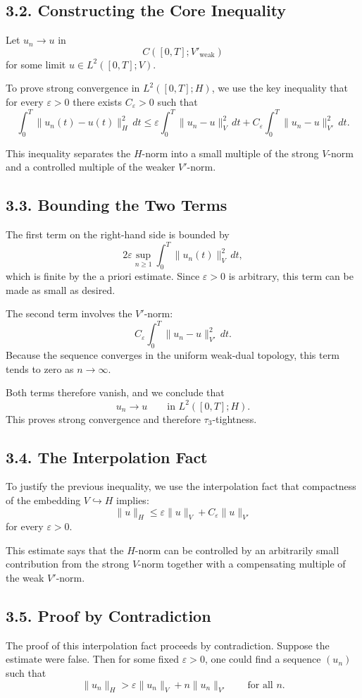 \documentclass[11pt]{article}
\theoremstyle{definition}
\theoremstyle{remark}
\begin{document}
\subsection*{3.2. Constructing the Core Inequality}
Let \(u_n\to u\) in
\[
C([0,T];V'_{\mathrm{weak}})
\]
for some limit \(u\in L^2([0,T];V)\).

To prove strong convergence in \(L^2([0,T];H)\), we use the key inequality that for every \(\varepsilon>0\) there exists \(C_\varepsilon>0\) such that
\[
\int_0^T \|u_n(t)-u(t)\|_H^2\,dt
\le
\varepsilon \int_0^T \|u_n-u\|_V^2\,dt
+
C_\varepsilon \int_0^T \|u_n-u\|_{V'}^2\,dt.
\]

This inequality separates the \(H\)-norm into a small multiple of the strong \(V\)-norm and a controlled multiple of the weaker \(V'\)-norm.

\subsection*{3.3. Bounding the Two Terms}
The first term on the right-hand side is bounded by
\[
2\varepsilon \sup_{n\ge 1}\int_0^T \|u_n(t)\|_V^2\,dt,
\]
which is finite by the a priori estimate. Since \(\varepsilon>0\) is arbitrary, this term can be made as small as desired.

The second term involves the \(V'\)-norm:
\[
C_\varepsilon \int_0^T \|u_n-u\|_{V'}^2\,dt.
\]
Because the sequence converges in the uniform weak-dual topology, this term tends to zero as \(n\to\infty\).

Both terms therefore vanish, and we conclude that
\[
u_n\to u
\qquad
\text{in } L^2([0,T];H).
\]
This proves strong convergence and therefore \(\tau_3\)-tightness.

\subsection*{3.4. The Interpolation Fact}
To justify the previous inequality, we use the interpolation fact that compactness of the embedding \(V\hookrightarrow H\) implies:
\[
\|u\|_H
\le
\varepsilon\|u\|_V+C_\varepsilon\|u\|_{V'}
\]
for every \(\varepsilon>0\).

This estimate says that the \(H\)-norm can be controlled by an arbitrarily small contribution from the strong \(V\)-norm together with a compensating multiple of the weak \(V'\)-norm.

\subsection*{3.5. Proof by Contradiction}
The proof of this interpolation fact proceeds by contradiction. Suppose the estimate were false. Then for some fixed \(\varepsilon>0\), one could find a sequence \((u_n)\) such that
\[
\|u_n\|_H>\varepsilon\|u_n\|_V+n\|u_n\|_{V'}
\qquad
\text{for all } n.
\]
\end{document}
